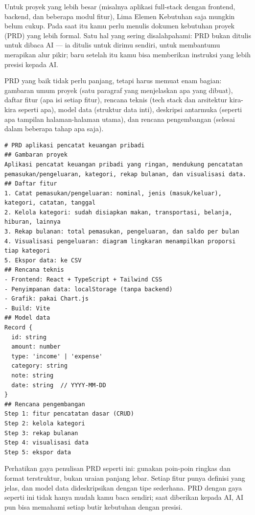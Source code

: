 Untuk proyek yang lebih besar (misalnya aplikasi full-stack dengan frontend, backend, dan beberapa modul fitur), Lima Elemen Kebutuhan saja mungkin belum cukup. Pada saat itu kamu perlu menulis dokumen kebutuhan proyek (PRD) yang lebih formal. Satu hal yang sering disalahpahami: PRD bukan ditulis untuk dibaca AI — ia ditulis untuk dirimu sendiri, untuk membantumu merapikan alur pikir; baru setelah itu kamu bisa memberikan instruksi yang lebih presisi kepada AI.

PRD yang baik tidak perlu panjang, tetapi harus memuat enam bagian: gambaran umum proyek (satu paragraf yang menjelaskan apa yang dibuat), daftar fitur (apa isi setiap fitur), rencana teknis (tech stack dan arsitektur kira-kira seperti apa), model data (struktur data inti), deskripsi antarmuka (seperti apa tampilan halaman-halaman utama), dan rencana pengembangan (selesai dalam beberapa tahap apa saja).

\begin{lstlisting}
# PRD aplikasi pencatat keuangan pribadi
## Gambaran proyek
Aplikasi pencatat keuangan pribadi yang ringan, mendukung pencatatan pemasukan/pengeluaran, kategori, rekap bulanan, dan visualisasi data.
## Daftar fitur
1. Catat pemasukan/pengeluaran: nominal, jenis (masuk/keluar), kategori, catatan, tanggal
2. Kelola kategori: sudah disiapkan makan, transportasi, belanja, hiburan, lainnya
3. Rekap bulanan: total pemasukan, pengeluaran, dan saldo per bulan
4. Visualisasi pengeluaran: diagram lingkaran menampilkan proporsi tiap kategori
5. Ekspor data: ke CSV
## Rencana teknis
- Frontend: React + TypeScript + Tailwind CSS
- Penyimpanan data: localStorage (tanpa backend)
- Grafik: pakai Chart.js
- Build: Vite
## Model data
Record {
  id: string
  amount: number
  type: 'income' | 'expense'
  category: string
  note: string
  date: string  // YYYY-MM-DD
}
## Rencana pengembangan
Step 1: fitur pencatatan dasar (CRUD)
Step 2: kelola kategori
Step 3: rekap bulanan
Step 4: visualisasi data
Step 5: ekspor data
\end{lstlisting}

Perhatikan gaya penulisan PRD seperti ini: gunakan poin-poin ringkas dan format terstruktur, bukan uraian panjang lebar. Setiap fitur punya definisi yang jelas, dan model data dideskripsikan dengan tipe sederhana. PRD dengan gaya seperti ini tidak hanya mudah kamu baca sendiri; saat diberikan kepada AI, AI pun bisa memahami setiap butir kebutuhan dengan presisi.


